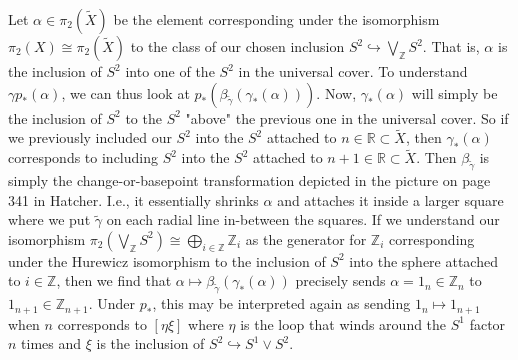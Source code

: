\begin{solution}
    Let $\alpha \in \pi_2 \left( \tilde{X} \right) $  be
    the element corresponding under the isomorphism
    $\pi_2 (X) \cong \pi_2(\tilde{X})$ to the class
    of our chosen
    inclusion $S^2 \hookrightarrow \bigvee_{\mathbb{Z}}S^2$.
    That is, $\alpha$ is the inclusion of
    $S^2$ into one of the $S^2$ in the universal cover.
    To understand $\gamma p_* \left( \alpha \right) $, we
    can thus look at
    $p_* \left( \beta_{\tilde{\gamma}} 
    \left( \gamma_* \left( \alpha \right)  \right) \right) $.
    Now, $\gamma_* \left( \alpha \right) $ will
    simply be the inclusion of $S^2$ to 
    the $S^2$ "above" the previous one in the
    universal cover. So if we previously included our
    $S^2$ into the $S^2$ attached to
    $n \in \mathbb{R} \subset \tilde{X}$, then
    $\gamma_* \left( \alpha \right) $ corresponds to
    including $S^2$ into the $S^2$ attached to
    $n+1 \in \mathbb{R} \subset \tilde{X}$.
    Then $\beta_{\tilde{\gamma}}$ is simply the change-or-basepoint
    transformation depicted in the picture on
    page 341 in Hatcher. I.e., it essentially shrinks
    $\alpha$ and attaches it inside a larger square
    where we put $\tilde{\gamma}$ on each radial line
    in-between  the squares. 
    If we understand our isomorphism
    $\pi_2 \left( \bigvee_{\mathbb{Z}}S^2 \right) 
    \cong \bigoplus_{i \in \mathbb{Z}}\mathbb{Z}_i$ as
    the generator for $\mathbb{Z}_i$ corresponding under
    the Hurewicz isomorphism to the inclusion
    of $S^2$ into the sphere attached to $i \in \mathbb{Z}$,
    then we find that
    $\alpha \mapsto 
    \beta_{\tilde{\gamma}} \left( \gamma_* \left( \alpha \right) 
    \right) $ precisely sends $\alpha = 
    1_n \in \mathbb{Z}_n$ to $1_{n+1} \in \mathbb{Z}_{n+1}$. 
    Under $p_*$, this
    may be interpreted again as
    sending $1_{n} \mapsto 1_{n+1}$ when
    $n$ corresponds to $ \left[ \eta
    \xi \right]$ where
    $\eta$ is the loop that winds around the $S^{1}$ factor
    $n$ times and
    $\xi$ is the inclusion of $S^2 \hookrightarrow
    S^{1} \vee S^2$.
    \end{solution}


